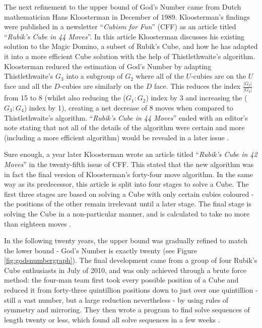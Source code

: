 \documentclass{report}
\newcommand{\tit}[1]{\textit{#1}}
\newcommand{\propernoun}[1]{\enquote{\tit{#1}}}
\begin{document}
    The next refinement to the upper bound of God's Number came from Dutch mathematician Hans Kloosterman in December of 1989. Kloosterman's findings were published in a newsletter \propernoun{Cubism for Fun} (CFF) as an article titled \propernoun{Rubik's Cube in 44 Moves}. In this article Kloosterman discusses his existing solution to the Magic Domino, a subset of Rubik's Cube, and how he has adapted it into a more efficient Cube solution with the help of Thistlethwaite's algorithm. Kloosterman reduced the estimation of God's Number by adapting Thistlethwaite's $G_3$ into a subgroup of $G_2$ where all of the $U$-cubies are on the $U$ face and all the $D$-cubies are similarly on the $D$ face. This reduces the index $\frac{|G_2|}{|G_3|}$ from 15 to 8 (whilst also reducing the ($G_1:G_2$) index by 3 and increasing the ($G_3:G_4$) index by 1), creating a net decrease of 8 moves when compared to Thistlethwaite's algorithm. \propernoun{Rubik's Cube in 44 Moves} ended with an editor's note stating that not all of the details of the algorithm were certain and more (including a more efficient algorithm) would be revealed in a later issue \cite{Kloosterman1989}.
    
    Sure enough, a year later Kloosterman wrote an article titled \propernoun{Rubik's Cube in 42 Moves} in the twenty-fifth issue of CFF. This stated that the new algorithm was in fact the final version of Kloosterman's forty-four move algorithm. In the same way as its predecessor, this article is split into four stages to solve a Cube. The first three stages are based on solving a Cube with only certain cubies coloured - the positions of the other remain irrelevant until a later stage. The final stage is solving the Cube in a non-particular manner, and is calculated to take no more than eighteen moves \cite{Kloosterman1990}.
    
    In the following twenty years, the upper bound was gradually refined to match the lower bound - God's Number is exactly twenty (see Figure \ref{fig:godsnumbergraph}). The final development came from a group of four Rubik's Cube enthusiasts in July of 2010, and was only achieved through a brute force method: the four-man team first took every possible position of a Cube and reduced it from forty-three quintillion positions down to just over one quintillion - still a vast number, but a large reduction nevertheless - by using rules of symmetry and mirroring. They then wrote a program to find solve sequences of length twenty or less, which found all solve sequences in a few weeks \cite{Rokicki2010}.
    
\end{document}

